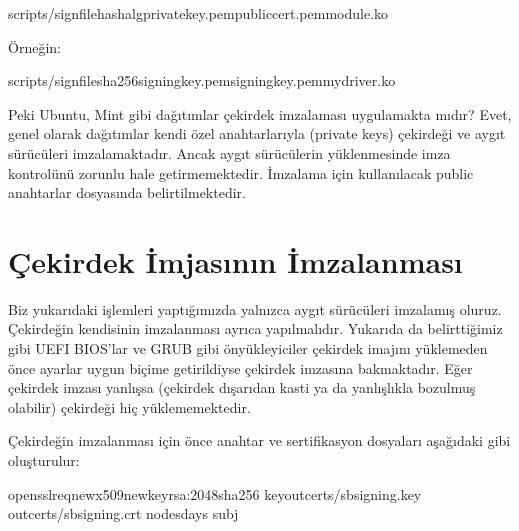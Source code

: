 \documentclass[a4paper,10pt,turkish]{sphinxmanual}
\begin{document}
\begin{sphinxVerbatim}[commandchars=\\\{\}]
\PYGZdl{}scripts/sign\PYGZhy{}file\PYGZlt{}hash\PYGZus{}alg\PYGZgt{}\PYGZlt{}private\PYGZus{}key.pem\PYGZgt{}\PYGZlt{}public\PYGZus{}cert.pem\PYGZgt{}\PYGZlt{}module.ko\PYGZgt{}
\end{sphinxVerbatim}

\sphinxAtStartPar
Örneğin:

\begin{sphinxVerbatim}[commandchars=\\\{\}]
\PYGZdl{}scripts/sign\PYGZhy{}filesha256signing\PYGZus{}key.pemsigning\PYGZus{}key.pemmydriver.ko
\end{sphinxVerbatim}

\sphinxAtStartPar
Peki Ubuntu, Mint gibi dağıtımlar çekirdek imzalaması uygulamakta mıdır? Evet, genel olarak dağıtımlar
kendi özel anahtarlarıyla (private keys) çekirdeği ve aygıt sürücüleri imzalamaktadır. Ancak aygıt
sürücülerin yüklenmesinde imza kontrolünü zorunlu hale getirmemektedir. İmzalama için kullanılacak
public anahtarlar  dosyasında belirtilmektedir.


\section{Çekirdek İmjasının İmzalanması}
\label{\detokenize{kernelcompilation:cekirdek-imjasinin-imzalanmasi}}
\sphinxAtStartPar
Biz yukarıdaki işlemleri yaptığımızda yalnızca aygıt sürücüleri imzalamış oluruz. Çekirdeğin kendisinin
imzalanması ayrıca yapılmalıdır. Yukarıda da belirttiğimiz gibi UEFI BIOS’lar ve GRUB gibi önyükleyiciler
çekirdek imajını yüklemeden önce ayarlar uygun biçime getirildiyse çekirdek imzasına bakmaktadır. Eğer
çekirdek imzası yanlışsa (çekirdek dışarıdan kasti ya da yanlışlıkla bozulmuş olabilir) çekirdeği hiç
yüklememektedir.

\sphinxAtStartPar
Çekirdeğin imzalanması için önce anahtar ve sertifikasyon dosyaları aşağıdaki gibi oluşturulur:

\begin{sphinxVerbatim}[commandchars=\\\{\}]
\PYGZdl{}opensslreq\PYGZhy{}new\PYGZhy{}x509\PYGZhy{}newkeyrsa:2048\PYGZhy{}sha256
\PYGZhy{}keyoutcerts/sb\PYGZhy{}signing.key
\PYGZhy{}outcerts/sb\PYGZhy{}signing.crt
\PYGZhy{}nodes\PYGZhy{}days
\PYGZhy{}subj
\end{sphinxVerbatim}
\end{document}
